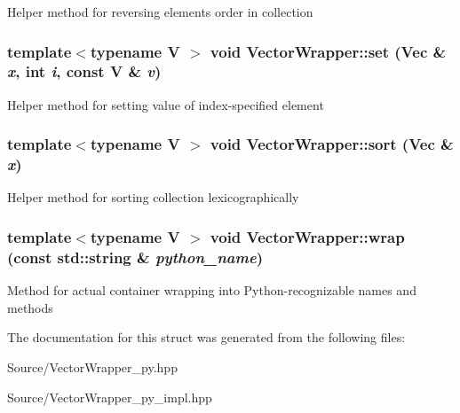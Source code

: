 \label{struct_stl_containers_wrappers_1_1_vector_wrapper_affef01a389d364fe81de5bb7234b8b4b}
Helper method for reversing elements order in collection \hypertarget{struct_stl_containers_wrappers_1_1_vector_wrapper_ab1fe165b0421a3621901c8cec68079ea}{
\subsubsection[{set}]{\setlength{\rightskip}{0pt plus 5cm}template$<$typename V $>$ void VectorWrapper::set (Vec \& {\em x}, \/  int {\em i}, \/  const V \& {\em v})}}
\label{struct_stl_containers_wrappers_1_1_vector_wrapper_ab1fe165b0421a3621901c8cec68079ea}
Helper method for setting value of index-\/specified element \hypertarget{struct_stl_containers_wrappers_1_1_vector_wrapper_a874fe836ed959b33fafef319cfd7305d}{
\subsubsection[{sort}]{\setlength{\rightskip}{0pt plus 5cm}template$<$typename V $>$ void VectorWrapper::sort (Vec \& {\em x})}}
\label{struct_stl_containers_wrappers_1_1_vector_wrapper_a874fe836ed959b33fafef319cfd7305d}
Helper method for sorting collection lexicographically \hypertarget{struct_stl_containers_wrappers_1_1_vector_wrapper_aadf4c7914637ece3c5704482b1db8763}{
\subsubsection[{wrap}]{\setlength{\rightskip}{0pt plus 5cm}template$<$typename V $>$ void VectorWrapper::wrap (const std::string \& {\em python\_\-name})}}
\label{struct_stl_containers_wrappers_1_1_vector_wrapper_aadf4c7914637ece3c5704482b1db8763}
Method for actual container wrapping into Python-\/recognizable names and methods 

The documentation for this struct was generated from the following files:\begin{DoxyCompactItemize}
\item 
Source/VectorWrapper\_\-py.hpp\item 
Source/VectorWrapper\_\-py\_\-impl.hpp\end{DoxyCompactItemize}
